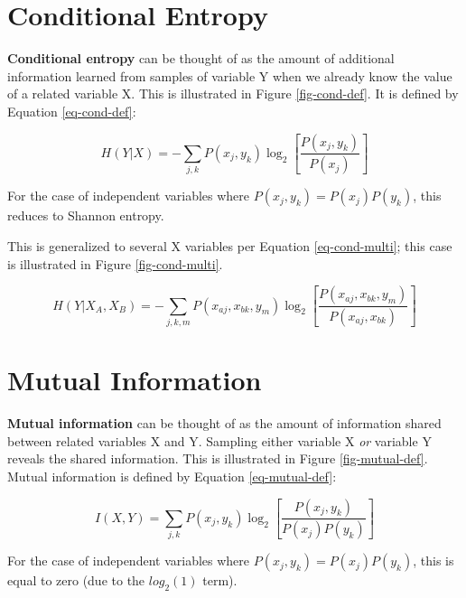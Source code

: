 \section{Conditional Entropy}
\label{sect-entropy-cond}

\textbf{Conditional entropy} can be thought of as the amount of additional
information learned from samples of variable Y when we already know the
value of a related variable X. This is illustrated in Figure
\ref{fig-cond-def}. It is defined by Equation \ref{eq-cond-def}:

\begin{equation}
H(Y|X) = - \sum_{j,k} P(x_j,y_k) \log_2 \left [
\frac{P(x_j,y_k)}{P(x_j)} \right ]
\label{eq-cond-def}
\end{equation}

For the case of independent variables where $P(x_j,y_k) = P(x_j) P(y_k)$,
this reduces to Shannon entropy.


This is generalized to several X variables per Equation \ref{eq-cond-multi};
this case is illustrated in Figure \ref{fig-cond-multi}.

\begin{equation}
H(Y|X_A,X_B) = - \sum_{j,k,m} P(x_{aj},x_{bk},y_m) \log_2 \left [
\frac{P(x_{aj},x_{bk},y_m)}{P(x_{aj},x_{bk})} \right ]
\label{eq-cond-multi}
\end{equation}


\clearpage
%
\section{Mutual Information}
\label{sect-entropy-mutual}

\textbf{Mutual information} can be thought of as the amount of information
shared between related variables X and Y. Sampling either variable X
\textit{or} variable Y reveals the shared information. This is illustrated
in Figure \ref{fig-mutual-def}. Mutual information is defined by
Equation \ref{eq-mutual-def}:

\begin{equation}
I(X,Y) = \sum_{j,k} P(x_j,y_k) \log_2 \left [
\frac{P(x_j,y_k)}{P(x_j) P(y_k)} \right ]
\label{eq-mutual-def}
\end{equation}

For the case of independent variables where $P(x_j,y_k) = P(x_j) P(y_k)$,
this is equal to zero (due to the $log_2(1)$ term).

